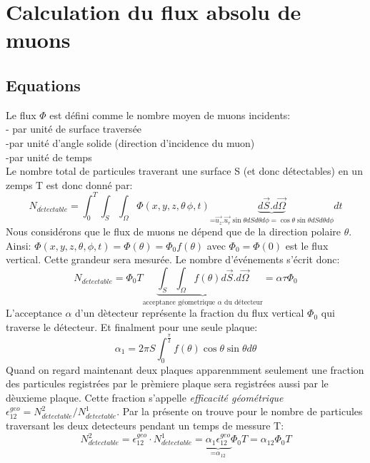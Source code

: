 \documentclass[a4paper,11pt,liststotocnumbered,bibtotocnumbered]{scrartcl}
\begin{document}
 \section{Calculation du flux absolu de muons}
  \subsection{Equations} 
  Le flux $\Phi$ est défini comme le nombre moyen de muons incidents:\\
- par unité de surface traversée\\
-par unité d'angle solide (direction d'incidence du muon)\\
-par unité de temps\\
Le nombre total de particules traverant une surface S (et donc détectables) en un zemps T est donc donné par:
\begin{equation*}
N_{d\acute etectable}=\int_0^T \int_S \int_{\Omega} \Phi(x,y,z,\theta \,\phi,t) \underbrace{d\vec{S}.d\vec{\Omega}}_{\text{=$\vec{u_z}.\vec{u_r}\sin\theta dS d\theta d\phi=\cos\theta \sin\theta dS d\theta d\phi$}}dt
\end{equation*}
Nous considérons que le flux de muons ne dépend que de la direction polaire $\theta$. Ainsi: $\Phi(x,y,z,\theta,\phi,t) = \Phi(\theta)=\Phi_0f(\theta)$ avec $\Phi_0=\Phi(0)$ est le flux vertical. Cette grandeur sera mesurée. Le nombre d'événements s'écrit donc: 
\begin{equation*}
N_{d\acute etectable}=\Phi_0 T\underbrace{ \int_S \int_{\Omega} f(\theta) d\vec{S}.d\vec{\Omega}}_{\text{acceptance géometrique $\alpha$ du détecteur}}=\alpha \tau \Phi_0
\end{equation*}
L'acceptance $\alpha$ d'un dètecteur représente la fraction du flux vertical $\Phi_0$ qui traverse le détecteur.
Et finalment pour une seule plaque:
\begin{equation*}
\alpha_1=2\pi S\int_0^{\frac{\pi}{2}}f(\theta)\cos\theta \sin\theta d \theta
\end{equation*}
Quand on regard maintenant deux plaques apparenmment seulement une fraction des particules registrées par le prèmiere plaque sera registrées aussi par le dèuxieme plaque. Cette fraction s'appelle \emph{efficacité géométrique} $\epsilon_{12}^{geo}=N_{d\acute etectable}^2/N_{d\acute etectable}^1$. Par la présente on trouve pour le nombre de particules traversant les deux detecteurs pendant un temps de messure T:
\begin{equation*}
N_{d\acute etectable}^2=\epsilon_{12}^{geo}\cdot N_{d\acute etectable}^1=\underbrace{\alpha_1 \epsilon_{12}^{geo}}_{\text{=$\alpha_{12}$}}\Phi_0 T=\alpha_{12}\Phi_0 T
\end{equation*}\\
\end{document}
